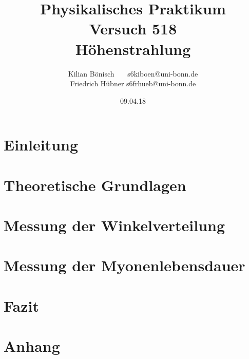 \documentclass{article}
\newcommand{\RM}[1]{\MakeUppercase{\romannumeral #1}}
\begin{document}
\setlength{\parindent}{0em}   %
\title{Physikalisches Praktikum \RM{5}\\Versuch 518\\Höhenstrahlung}
\author{Kilian Bönisch \ \ \ \qquad s6kiboen@uni-bonn.de \\
  Friedrich Hübner \qquad s6frhueb@uni-bonn.de }
\date{09.04.18}

\maketitle
\thispagestyle{empty}

\newpage

\thispagestyle{empty}

\tableofcontents

\newpage

\section{Einleitung}



\section{Theoretische Grundlagen}



\newpage

\section{Messung der Winkelverteilung}





\section{Messung der Myonenlebensdauer}





\FloatBarrier
\section{Fazit}



\FloatBarrier

\newpage

\printbibliography

\newpage

\section{Anhang}


\end{document}
